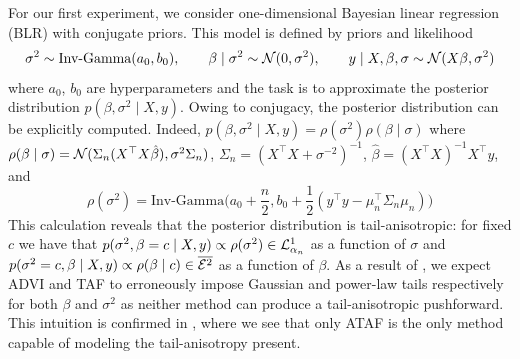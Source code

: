 \documentclass{article}
\theoremstyle{definition}
\theoremstyle{remark}
\begin{document}
For our first experiment, we consider one-dimensional Bayesian linear regression (BLR)
with conjugate priors. This model is defined by priors and likelihood
\begin{align*}
    \sigma^2 \sim \text{Inv-Gamma}(a_0, b_0), \qquad
    \beta \mid \sigma^2 \sim \mathcal{N}(0, \sigma^2),\qquad 
    y \mid X, \beta, \sigma \sim \mathcal{N}(X \beta, \sigma^2) 
\end{align*}
where $a_0$, $b_0$ are hyperparameters and the task is to approximate the posterior
distribution $p(\beta,\sigma^2 \mid X, y)$. Owing to conjugacy,
the posterior distribution can be explicitly computed. Indeed, $p(\beta,\sigma^2 \mid X, y) = \rho(\sigma^2)\rho(\beta \mid \sigma)$ where $\rho(\beta \mid \sigma) = \mathcal{N}(\Sigma_n(X^\top X \hat\beta), \sigma^2 \Sigma_n)$, $\Sigma_n = (X^\top X + \sigma^{-2})^{-1}$, $\hat\beta = (X^\top X)^{-1} X^\top y$, and
    \[
    \rho(\sigma^2) = \text{Inv-Gamma}\bigg(
    a_0 + \frac{n}{2}, 
    b_0 + \frac{1}{2}(y^\top y - \mu_n^\top \Sigma_n \mu_n)\bigg)%
    \]
This calculation reveals that the posterior distribution is tail-anisotropic:
for fixed $c$ we have that $p(\sigma^2, \beta=c \mid X, y) \propto \rho(\sigma^2) \in \mathcal{L}^1_{\alpha_n}$
as a function of $\sigma$
and $p(\sigma^2=c, \beta \mid X, y) \propto \rho(\beta \mid c) \in \overline{\mathcal{E}^2}$
as a function of $\beta$.
As a result of , we expect ADVI and TAF to erroneously impose
Gaussian and power-law tails respectively for both $\beta$ and $\sigma^2$ as neither method
can produce a tail-anisotropic pushforward. This intuition is confirmed in ,
where we see that only ATAF is the only method capable of modeling the tail-anisotropy present.
 
\end{document}
